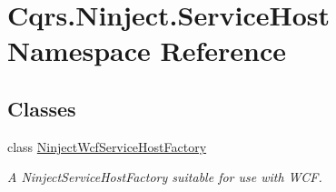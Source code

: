 \hypertarget{namespaceCqrs_1_1Ninject_1_1ServiceHost}{}\section{Cqrs.\+Ninject.\+Service\+Host Namespace Reference}
\label{namespaceCqrs_1_1Ninject_1_1ServiceHost}
\subsection*{Classes}
\begin{DoxyCompactItemize}
\item 
class \hyperlink{classCqrs_1_1Ninject_1_1ServiceHost_1_1NinjectWcfServiceHostFactory}{Ninject\+Wcf\+Service\+Host\+Factory}
\begin{DoxyCompactList}\small\item\em A Ninject\+Service\+Host\+Factory suitable for use with W\+CF. \end{DoxyCompactList}\end{DoxyCompactItemize}
